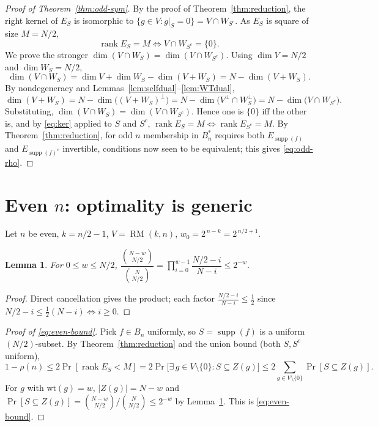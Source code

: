 \documentclass{amsart}
\newtheorem{lemma}[theorem]{Lemma}
\theoremstyle{definition}
\DeclareMathOperator{\supp}{supp}
\DeclareMathOperator{\RM}{RM}
\DeclareMathOperator{\rank}{rank}
\begin{document}
\begin{proof}[Proof of Theorem~\ref{thm:odd-sym}]
By the proof of Theorem~\ref{thm:reduction}, the right kernel of $E_S$ is
isomorphic to $\{g\in V:g|_S=0\}=V\cap W_{S^c}$. As $E_S$ is square of size
$M=N/2$,
\begin{equation}\label{eq:ker}
\rank E_S=M\iff V\cap W_{S^c}=\{0\}.
\end{equation}
We prove the stronger
$\dim(V\cap W_S)=\dim(V\cap W_{S^c})$. Using $\dim V=N/2$ and
$\dim W_S=N/2$,
\[
\dim(V\cap W_S)=\dim V+\dim W_S-\dim(V+W_S)=N-\dim(V+W_S).
\]
By nondegeneracy and Lemmas~\ref{lem:selfdual}--\ref{lem:WTdual},
\[
\dim(V+W_S)=N-\dim\bigl((V+W_S)^{\perp}\bigr)
=N-\dim\bigl(V^{\perp}\cap W_S^{\perp}\bigr)
=N-\dim\bigl(V\cap W_{S^c}\bigr).
\]
Substituting, $\dim(V\cap W_S)=\dim(V\cap W_{S^c})$. Hence one is $\{0\}$
iff the other is, and by \eqref{eq:ker} applied to $S$ and $S^c$,
$\rank E_S=M\iff\rank E_{S^c}=M$. By Theorem~\ref{thm:reduction}, for odd
$n$ membership in $B_n^*$ requires both $E_{\supp(f)}$ and
$E_{\supp(f)^c}$ invertible, conditions now seen to be equivalent; this
gives \eqref{eq:odd-rho}.
\end{proof}

\section{Even $n$: optimality is generic}\label{sec:even}

Let $n$ be even, $k=n/2-1$, $V=\RM(k,n)$, $w_0=2^{\,n-k}=2^{\,n/2+1}$.

\begin{lemma}\label{lem:ratio}
For $0\le w\le N/2$,
$\dfrac{\binom{N-w}{N/2}}{\binom{N}{N/2}}
=\prod_{i=0}^{w-1}\dfrac{N/2-i}{N-i}\le 2^{-w}$.
\end{lemma}
\begin{proof}
Direct cancellation gives the product; each factor
$\frac{N/2-i}{N-i}\le\frac12$ since $N/2-i\le\frac12(N-i)\iff i\ge0$.
\end{proof}

\begin{proof}[Proof of \eqref{eq:even-bound}]
Pick $f\in B_n$ uniformly, so $S=\supp(f)$ is a uniform $(N/2)$-subset.
By Theorem~\ref{thm:reduction} and the union bound (both $S,S^c$ uniform),
\[
1-\rho(n)\le 2\Pr[\rank E_S<M]
=2\Pr\bigl[\exists\,g\in V\setminus\{0\}:S\subseteq Z(g)\bigr]
\le 2\!\!\sum_{g\in V\setminus\{0\}}\!\!\Pr[S\subseteq Z(g)].
\]
For $g$ with $\mathrm{wt}(g)=w$, $|Z(g)|=N-w$ and
$\Pr[S\subseteq Z(g)]=\binom{N-w}{N/2}/\binom{N}{N/2}\le2^{-w}$ by
Lemma~\ref{lem:ratio}. This is \eqref{eq:even-bound}.
\end{proof}
\end{document}
